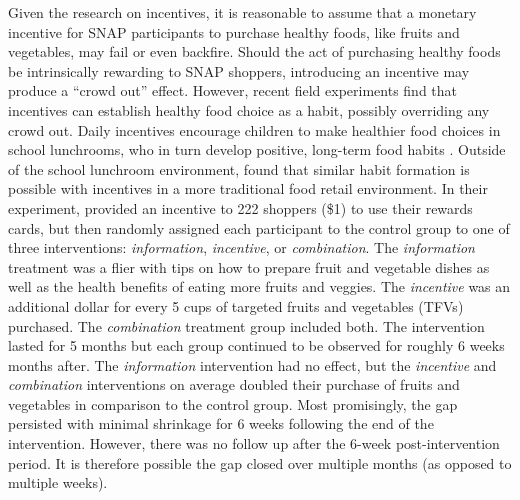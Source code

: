 \documentclass[12pt,letterpaperpaper,]{book}
\begin{document}
Given the research on incentives, it is reasonable to assume that a
monetary incentive for SNAP participants to purchase healthy foods, like
fruits and vegetables, may fail or even backfire. Should the act of
purchasing healthy foods be intrinsically rewarding to SNAP shoppers,
introducing an incentive may produce a ``crowd out'' effect. However,
recent field experiments find that incentives can establish healthy food
choice as a habit, possibly overriding any crowd out. Daily incentives
encourage children to make healthier food choices in school lunchrooms,
who in turn develop positive, long-term food habits
\citep{loewenstein_habit_2016, list_behavioralist_2015, belot_incentives_2014}.
Outside of the school lunchroom environment,
\citet{list_incentives_2015} found that similar habit formation is
possible with incentives in a more traditional food retail environment.
In their experiment, \citet{list_incentives_2015} provided an incentive
to 222 shoppers (\$1) to use their rewards cards, but then randomly
assigned each participant to the control group to one of three
interventions: \emph{information}, \emph{incentive}, or
\emph{combination}. The \emph{information} treatment was a flier with
tips on how to prepare fruit and vegetable dishes as well as the health
benefits of eating more fruits and veggies. The \emph{incentive} was an
additional dollar for every 5 cups of targeted fruits and vegetables
(TFVs) purchased. The \emph{combination} treatment group included both.
The intervention lasted for 5 months but each group continued to be
observed for roughly 6 weeks months after. The \emph{information}
intervention had no effect, but the \emph{incentive} and
\emph{combination} interventions on average doubled their purchase of
fruits and vegetables in comparison to the control group. Most
promisingly, the gap persisted with minimal shrinkage for 6 weeks
following the end of the intervention. However, there was no follow up
after the 6-week post-intervention period. It is therefore possible the
gap closed over multiple months (as opposed to multiple weeks).
\end{document}
